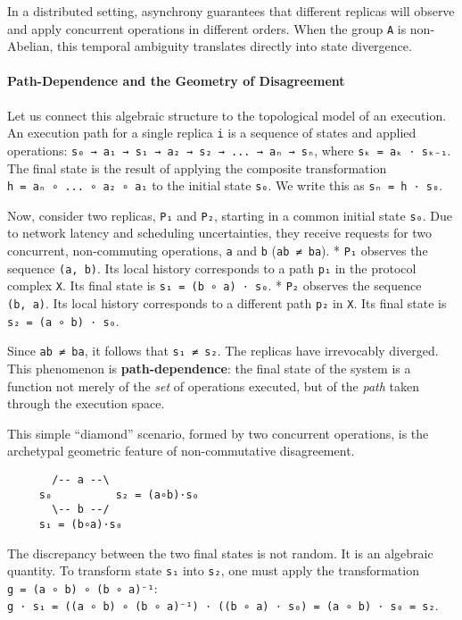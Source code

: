 \documentclass[
]{article}
\begin{document}
In a distributed setting, asynchrony guarantees that different replicas
will observe and apply concurrent operations in different orders. When
the group \texttt{A} is non-Abelian, this temporal ambiguity translates
directly into state divergence.

\paragraph{Path-Dependence and the Geometry of
Disagreement}\label{path-dependence-and-the-geometry-of-disagreement}

Let us connect this algebraic structure to the topological model of an
execution. An execution path for a single replica \texttt{i} is a
sequence of states and applied operations:
\texttt{s₀\ →\ a₁\ →\ s₁\ →\ a₂\ →\ s₂\ →\ ...\ →\ aₙ\ →\ sₙ}, where
\texttt{sₖ\ =\ aₖ\ ⋅\ sₖ₋₁}. The final state is the result of applying
the composite transformation \texttt{h\ =\ aₙ\ ∘\ ...\ ∘\ a₂\ ∘\ a₁} to
the initial state \texttt{s₀}. We write this as
\texttt{sₙ\ =\ h\ ⋅\ s₀}.

Now, consider two replicas, \texttt{P₁} and \texttt{P₂}, starting in a
common initial state \texttt{s₀}. Due to network latency and scheduling
uncertainties, they receive requests for two concurrent, non-commuting
operations, \texttt{a} and \texttt{b} (\texttt{ab\ ≠\ ba}). *
\texttt{P₁} observes the sequence \texttt{(a,\ b)}. Its local history
corresponds to a path \texttt{p₁} in the protocol complex \texttt{X}.
Its final state is \texttt{s₁\ =\ (b\ ∘\ a)\ ⋅\ s₀}. * \texttt{P₂}
observes the sequence \texttt{(b,\ a)}. Its local history corresponds to
a different path \texttt{p₂} in \texttt{X}. Its final state is
\texttt{s₂\ =\ (a\ ∘\ b)\ ⋅\ s₀}.

Since \texttt{ab\ ≠\ ba}, it follows that \texttt{s₁\ ≠\ s₂}. The
replicas have irrevocably diverged. This phenomenon is
\textbf{path-dependence}: the final state of the system is a function
not merely of the \emph{set} of operations executed, but of the
\emph{path} taken through the execution space.

This simple ``diamond'' scenario, formed by two concurrent operations,
is the archetypal geometric feature of non-commutative disagreement.

\begin{verbatim}
       /-- a --\
     s₀          s₂ = (a∘b)⋅s₀
       \-- b --/
     s₁ = (b∘a)⋅s₀
\end{verbatim}

The discrepancy between the two final states is not random. It is an
algebraic quantity. To transform state \texttt{s₁} into \texttt{s₂}, one
must apply the transformation \texttt{g\ =\ (a\ ∘\ b)\ ∘\ (b\ ∘\ a)⁻¹}:
\texttt{g\ ⋅\ s₁\ =\ ((a\ ∘\ b)\ ∘\ (b\ ∘\ a)⁻¹)\ ⋅\ ((b\ ∘\ a)\ ⋅\ s₀)\ =\ (a\ ∘\ b)\ ⋅\ s₀\ =\ s₂}.
\end{document}
